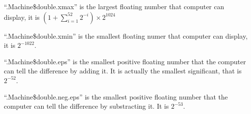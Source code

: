\documentclass[]{book}
\begin{document}
``.Machine\$double.xmax'' is the largest floating number that computer
can display, it is \((1+\sum_{i = 1}^{52}2^{-i})\times 2^{1024}\)

``.Machine\$double.xmin'' is the smallest floating numer that computer
can display, it is \(2^{-1022}\).

``.Machine\$double.eps'' is the smallest positive floating number that
the computer can tell the difference by adding it. It is actually the
smallest significant, that is \(2^{-52}\).

``.Machine\$double.neg.eps'' is the smallest positive floating number
that the computer can tell the difference by substracting it. It is
\(2^{-53}\).


\end{document}
